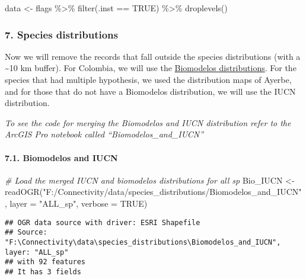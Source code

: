 \documentclass[
]{article}
\newenvironment{Shaded}{\begin{snugshade}}{\end{snugshade}}
\newcommand{\AttributeTok}[1]{\textcolor[rgb]{0.77,0.63,0.00}{#1}}
\newcommand{\CommentTok}[1]{\textcolor[rgb]{0.56,0.35,0.01}{\textit{#1}}}
\newcommand{\ConstantTok}[1]{\textcolor[rgb]{0.00,0.00,0.00}{#1}}
\newcommand{\FunctionTok}[1]{\textcolor[rgb]{0.00,0.00,0.00}{#1}}
\newcommand{\NormalTok}[1]{#1}
\newcommand{\OtherTok}[1]{\textcolor[rgb]{0.56,0.35,0.01}{#1}}
\newcommand{\SpecialCharTok}[1]{\textcolor[rgb]{0.00,0.00,0.00}{#1}}
\newcommand{\StringTok}[1]{\textcolor[rgb]{0.31,0.60,0.02}{#1}}
\begin{document}
\begin{Shaded}
\begin{Highlighting}[]
\NormalTok{data }\OtherTok{\textless{}{-}}\NormalTok{ flags }\SpecialCharTok{\%\textgreater{}\%}
  \FunctionTok{filter}\NormalTok{(.inst }\SpecialCharTok{==} \ConstantTok{TRUE}\NormalTok{) }\SpecialCharTok{\%\textgreater{}\%}
  \FunctionTok{droplevels}\NormalTok{()}
\end{Highlighting}
\end{Shaded}

\hypertarget{species-distributions}{%
\subsubsection{7. Species distributions}\label{species-distributions}}

Now we will remove the records that fall outside the species
distributions (with a \textasciitilde10 km buffer). For Colombia, we
will use the \href{http://biomodelos.humboldt.org.co/es}{Biomodelos
distributions}. For the species that had multiple hypothesis, we used
the distribution maps of Ayerbe, and for those that do not have a
Biomodelos distribution, we will use the IUCN distribution.

\emph{To see the code for merging the Biomodelos and IUCN distribution
refer to the ArcGIS Pro notebook called ``Biomodelos\_and\_IUCN''}

\hypertarget{biomodelos-and-iucn}{%
\paragraph{7.1. Biomodelos and IUCN}\label{biomodelos-and-iucn}}

\begin{Shaded}
\begin{Highlighting}[]
\CommentTok{\# Load the merged IUCN and biomodelos distributions for all sp}
\NormalTok{Bio\_IUCN }\OtherTok{\textless{}{-}} \FunctionTok{readOGR}\NormalTok{(}\StringTok{"F:/Connectivity/data/species\_distributions/Biomodelos\_and\_IUCN"}\NormalTok{, }\AttributeTok{layer =} \StringTok{"ALL\_sp"}\NormalTok{, }\AttributeTok{verbose =} \ConstantTok{TRUE}\NormalTok{)}
\end{Highlighting}
\end{Shaded}

\begin{verbatim}
## OGR data source with driver: ESRI Shapefile 
## Source: "F:\Connectivity\data\species_distributions\Biomodelos_and_IUCN", layer: "ALL_sp"
## with 92 features
## It has 3 fields
\end{verbatim}
\end{document}
